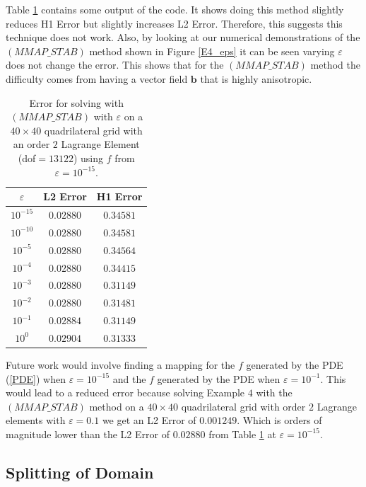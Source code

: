 \documentclass[12pt]{ociamthesis}
\begin{document}
Table \ref{Tbl_Map_f} contains some output of the code. It shows doing this method slightly reduces H1 Error but slightly increases L2 Error. Therefore, this suggests this technique does not work. Also, by looking at our numerical demonstrations of the $(MMAP\_STAB)$ method shown in Figure \ref{E4_eps} it can be seen varying $\varepsilon$ does not change the error. This shows that for the $(MMAP\_STAB)$ method the difficulty comes from having a vector field $\mathbf{b}$ that is highly anisotropic. 
\begin{table}[H]
\begin{center}
\begin{tabular}{||ccc||}
\cline{2-3}
\multicolumn{1}{c|}{$\varepsilon$} & \multicolumn{1}{c|}{L2 Error} & \multicolumn{1}{c|}{H1 Error} \\
\hline 
\hline
$10^{-15}$  &  $0.02880$   &  $0.34581$\\
$10^{-10}$  &  $0.02880$   &  $0.34581$\\
$10^{-5}$  &  $0.02880$   &  $0.34564$\\
$10^{-4}$  &  $0.02880$   &  $0.34415$\\
$10^{-3}$  &  $0.02880$   &  $0.31149$\\
$10^{-2}$  &  $0.02880$   &  $0.31481$\\
$10^{-1}$  &  $0.02884$   &  $0.31149$\\
$10^{0}$  &  $0.02904$   &  $0.31333$\\
\hline
\end{tabular}
\end{center}
\caption{Error for solving with $(MMAP\_STAB)$ with $\varepsilon$ on a $40 \times 40$ quadrilateral grid with an order $2$ Lagrange Element (dof$=13122$) using $f$ from $\varepsilon=10^{-15}$.}
\label{Tbl_Map_f}
\end{table}
Future work would involve finding a mapping for the $f$ generated by the PDE (\ref{PDE}) when $\varepsilon=10^{-15}$ and the $f$ generated by the PDE when $\varepsilon=10^{-1}$. This would lead to a reduced error because solving Example $4$ with the $(MMAP\_STAB)$ method on a $40 \times 40$ quadrilateral grid with order $2$ Lagrange elements with $\varepsilon = 0.1$ we get an L2 Error of $0.001249$. Which is orders of magnitude lower than the L2 Error of $0.02880$ from Table \ref{Tbl_Map_f} at $\varepsilon=10^{-15}$.

\subsection{Splitting of Domain}
\end{document}
